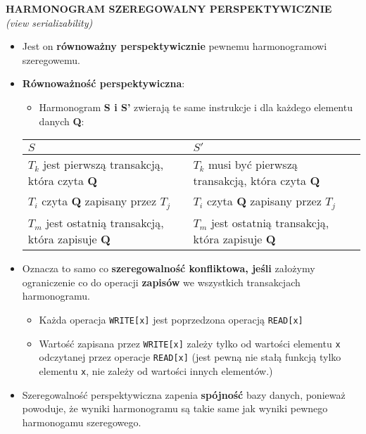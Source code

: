 \documentclass[a5paper,6pt]{article}
\begin{document}
    \textbf{HARMONOGRAM SZEREGOWALNY PERSPEKTYWICZNIE}\\
    \textit{(view serializability)}
    \begin{itemize}
        \item Jest on \textbf{równoważny perspektywicznie} pewnemu
        harmonogramowi szeregowemu.
        \item \textbf{Równoważność perspektywiczna}:
        \begin{itemize}
            \item Harmonogram \textbf{S i S'} zwierają te same instrukcje i dla
                  każdego elementu danych \textbf{Q}:
        \end{itemize}

\begin{adjustbox}{width=\columnwidth,center}
    \begin{tabular}{|l|l|}
        \hline
        $S$ & $S'$ \\
        \hline
        $T_k$ jest pierwszą transakcją, która czyta \textbf{Q} &
        $T_k$ musi być pierwszą transakcją, która czyta \textbf{Q} \\

        $T_i$ czyta \textbf{Q} zapisany przez $T_j$ &
        $T_i$ czyta \textbf{Q} zapisany przez $T_j$\\

        $T_m$ jest ostatnią transakcją, która zapisuje \textbf{Q} &
        $T_m$ jest ostatnią transakcją, która zapisuje \textbf{Q}\\
        \hline
    \end{tabular}
\end{adjustbox}

        \item Oznacza to samo co \textbf{szeregowalność konfliktowa, jeśli}
              założymy ograniczenie co do operacji \textbf{zapisów} we
              wszystkich transakcjach harmonogramu.
        \begin{itemize}
            \item Każda operacja \texttt{WRITE[x]} jest poprzedzona operacją
                  \texttt{READ[x]}
            \item Wartość zapisana przez \texttt{WRITE[x]} zależy tylko od
                  wartości elementu \texttt{x} odczytanej przez operacje
                  \texttt{READ[x]} (jest pewną nie stałą funkcją tylko elementu
                  \texttt{x}, nie zależy od wartości innych elementów.)
        \end{itemize}

        \item Szeregowalność perspektywiczna zapenia \textbf{spójność} bazy
              danych, ponieważ powoduje, że wyniki harmonogramu są takie same
              jak wyniki pewnego harmonogamu szeregowego.
    \end{itemize}
\end{document}
